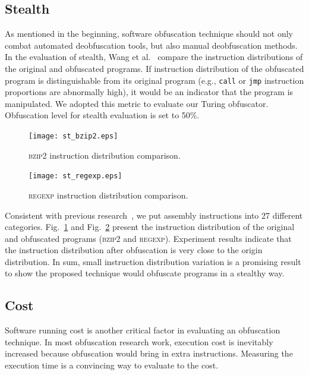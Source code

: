 \documentclass[lnicst]{svmultln}
\newcommand{\F}{Fig.}
\begin{document}
\subsection{Stealth}
As mentioned in the beginning, software obfuscation technique should not only
combat automated deobfuscation tools, but also manual deobfuscation methods. In
the evaluation of stealth, Wang et al.~\cite{Trans} compare the instruction
distributions of the original and obfuscated programs. If instruction
distribution of the obfuscated program is distinguishable from its original
program (e.g., \texttt{call} or \texttt{jmp} instruction proportions are
abnormally high), it would be an indicator that the program is manipulated. We
adopted this metric to evaluate our Turing obfuscator. Obfuscation level for
stealth evaluation is set to 50\%.

\begin{figure}
  \texttt{[image: st\_bzip2.eps]}
  \caption{\textsc{bzip2} instruction distribution comparison.}
  \label{fig:bzip2}
\end{figure}

\begin{figure}
  \texttt{[image: st\_regexp.eps]}
  \caption{\textsc{regexp} instruction distribution comparison.}
  \label{fig:regexp}
\end{figure}

Consistent with previous research~\cite{Trans}, we put assembly instructions
into 27 different categories. \F~\ref{fig:bzip2} and \F~\ref{fig:regexp} present
the instruction distribution of the original and obfuscated programs
(\textsc{bzip2} and \textsc{regexp}). Experiment results indicate that the
instruction distribution after obfuscation is very close to the origin
distribution.
In sum, small instruction distribution variation is a promising result to show
the proposed technique would obfuscate programs in a stealthy way.

\subsection{Cost}
Software running cost is another critical factor in evaluating an obfuscation
technique. In most obfuscation research work, execution cost is inevitably
increased because obfuscation would bring in extra instructions. Measuring the
execution time is a convincing way to evaluate to the cost.
\end{document}
